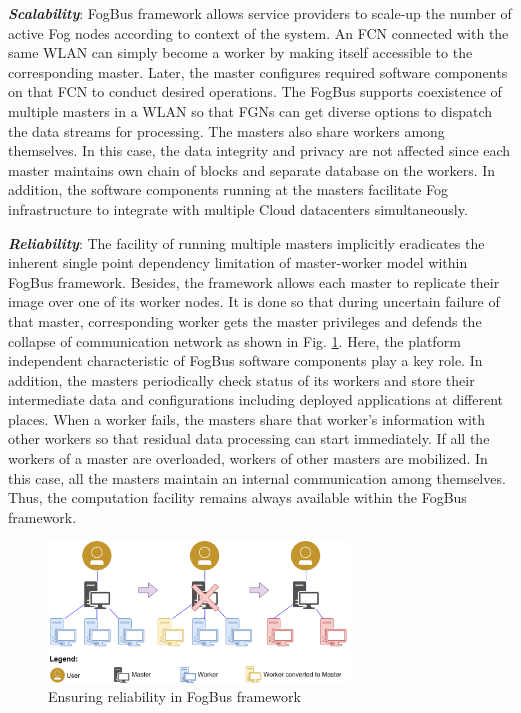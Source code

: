 \documentclass[final,5p,times,twocolumn]{elsarticle}
\begin{document}
\par \textbf{\textit{Scalability}}: FogBus framework allows service providers to scale-up the number of active Fog nodes according to context of the system. An FCN connected with the same WLAN can simply become a worker by making itself accessible to the corresponding master. Later, the master configures required software components on that FCN to conduct desired operations. The FogBus supports coexistence of multiple masters in a WLAN so that FGNs can get diverse options to dispatch the data streams for processing. The masters also share workers among themselves. In this case, the data integrity and privacy are not affected since each master maintains own chain of blocks and separate database on the workers. In addition, the software components running at the masters facilitate Fog infrastructure to integrate with multiple Cloud datacenters simultaneously.
%
\par \textbf{\textit{Reliability}}: The facility of running multiple masters implicitly eradicates the inherent single point dependency limitation of master-worker model within FogBus framework. Besides, the framework allows each master to replicate their image over one of its worker nodes. It is done so that during uncertain failure of that master, corresponding worker gets the master privileges and defends the collapse of communication network as shown in Fig. \ref{Fig:reliability}. Here, the platform independent characteristic of FogBus software components play a key role. In addition, the masters periodically check status of its workers and store their intermediate data and configurations including deployed applications at different places. When a worker fails, the masters share that worker's information with other workers so that residual data processing can start immediately. If all the workers of a master are overloaded, workers of other masters are mobilized. In this case, all the masters maintain an internal communication among themselves. Thus, the computation facility remains always available within the FogBus framework.
%
\begin{figure}[!t]
\centering 
\includegraphics[width=80mm]{reliability.png}
\caption{Ensuring reliability in FogBus framework}
\label{Fig:reliability}
\end{figure} 
\end{document}
